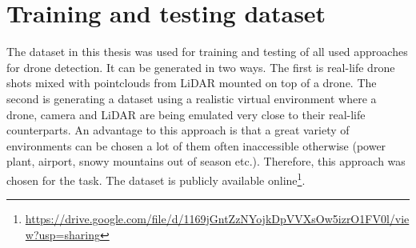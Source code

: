 \documentclass[twoside]{ctuthesis}
\theoremstyle{plain}
\theoremstyle{definition}
\theoremstyle{note}
\begin{document}
\section{Training and testing dataset} \label{s:2.6}
The dataset in this thesis was used for training and testing of all used approaches for drone detection. It can be generated in two ways. The first is real-life drone shots mixed with pointclouds from LiDAR mounted on top of a drone. The second is generating a dataset using a realistic virtual environment where a drone, camera and LiDAR are being emulated very close to their real-life counterparts. An advantage to this approach is that a great variety of environments can be chosen a lot of them often inaccessible otherwise (power plant, airport, snowy mountains out of season etc.). Therefore, this approach was chosen for the task. The dataset is publicly available online\footnote{\url{https://drive.google.com/file/d/1169jGntZzNYojkDpVVXsOw5izrO1FV0l/view?usp=sharing}}.
\end{document}
